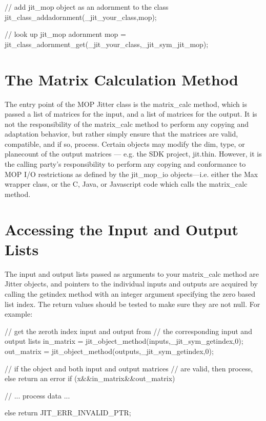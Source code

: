 \begin{DoxyCode}
   // add jit_mop object as an adornment to the class
   jit_class_addadornment(_jit_your_class,mop);

   // look up jit_mop adornment 
   mop = jit_class_adornment_get(_jit_your_class,_jit_sym_jit_mop);
\end{DoxyCode}
\hypertarget{chapter_jit_mopdetails_chapter_jit_mopdetails_calc}{}\section{The Matrix Calculation Method}\label{chapter_jit_mopdetails_chapter_jit_mopdetails_calc}
The entry point of the MOP Jitter class is the matrix\_\-calc method, which is passed a list of matrices for the input, and a list of matrices for the output. It is not the responsibility of the matrix\_\-calc method to perform any copying and adaptation behavior, but rather simply ensure that the matrices are valid, compatible, and if so, process. Certain objects may modify the dim, type, or planecount of the output matrices — e.g. the SDK project, jit.thin. However, it is the calling party's responsibility to perform any copying and conformance to MOP I/O restrictions as defined by the jit\_\-mop\_\-io objects—i.e. either the Max wrapper class, or the C, Java, or Javascript code which calls the matrix\_\-calc method.\hypertarget{chapter_jit_mopdetails_chapter_jit_mopdetails_access}{}\section{Accessing the Input and Output Lists}\label{chapter_jit_mopdetails_chapter_jit_mopdetails_access}
The input and output lists passed as arguments to your matrix\_\-calc method are Jitter objects, and pointers to the individual inputs and outputs are acquired by calling the getindex method with an integer argument specifying the zero based list index. The return values should be tested to make sure they are not null. For example:


\begin{DoxyCode}
   // get the zeroth index input and output from 
   // the corresponding input and output lists
   in_matrix    = jit_object_method(inputs,_jit_sym_getindex,0);
   out_matrix   = jit_object_method(outputs,_jit_sym_getindex,0);
   
   // if the object and both input and output matrices
   // are valid, then process, else return an error
   if (x&&in_matrix&&out_matrix) 
   {
      // ... process data ...

   } else {
      return JIT_ERR_INVALID_PTR;
   }
\end{DoxyCode}


